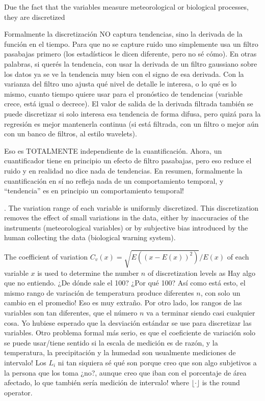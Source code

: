 Due the fact that the variables measure meteorological or biological
processes, they are discretized %
%
{Formalmente la discretización NO captura tendencias, sino la derivada
  de la función en el tiempo.  Para que no se capture ruido uno
  simplemente usa un filtro pasabajas primero (los estadísticos le
  dicen diferente, pero no sé cómo).  En otras palabras, si querés la
  tendencia, con usar la derivada de un filtro gaussiano sobre los
  datos ya se ve la tendencia muy bien con el signo de esa derivada.
  Con la varianza del filtro uno ajusta qué nivel de detalle le
  interesa, o lo qué es lo mismo, cuanto tiempo quiere usar para el
  pronóstico de tendencias (variable crece, está igual o decrece).  El
  valor de salida de la derivada filtrada también se puede discretizar
  si solo interesa esa tendencia de forma difusa, pero quizá para la
  regresión es mejor mantenerla continua (si está filtrada, con un
  filtro o mejor aún con un banco de filtros, al estilo wavelets).

  Eso es TOTALMENTE independiente de la cuantificación.  Ahora, un
  cuantificador tiene en principio un efecto de filtro pasabajas, pero
  eso reduce el ruido y en realidad no dice nada de tendencias.  En
  resumen, formalmente la cuantificación en sí no refleja nada de un
  comportamiento temporal, y ``tendencia'' es en principio un
  comportamiento temporal!}.
%
The variation range of each variable is uniformly discretized.
%
This discretization removes the effect of small variations in the data,
either by inaccuracies of the instruments (meteorological variables)
or by subjective bias introduced by the human collecting the data
(biological warning system).

The coefficient of variation
$C_v(x)={\sqrt{E((x-E(x))^2)}}/{E(x)}$ of each variable $x$ is
used to determine the number $n$ of discretization levels as
%
%
{Hay algo que no entiendo.  ¿De dónde sale el 100?  ¿Por qué 100?
  Así como está esto, el mismo rango de variación de temperatura
  produce diferentes $n$, con solo un cambio en el promedio!  Eso es
  muy extraño.  Por otro lado, los rangos de las variables son tan
  diferentes, que el número $n$ va a terminar siendo casi cualquier
  cosa.  Yo hubiese esperado que la desviación estándar se use para
  discretizar las variables.  Otro problema formal más serio, es que
  el coeficiente de variación solo se puede usar/tiene sentido si la
  escala de medición es de razón, y la temperatura, la precipitación y
  la humedad son usualmente mediciones de intervalo! Los $L_i$ ni tan
  siquiera sé qué son porque creo que son algo subjetivos a la persona
  que los toma ¿no?, aunque creo que iban con el porcentaje de área
  afectado, lo que también sería medición de intervalo!}
%
where $\lfloor \cdot \rfloor$ is the round operator.


